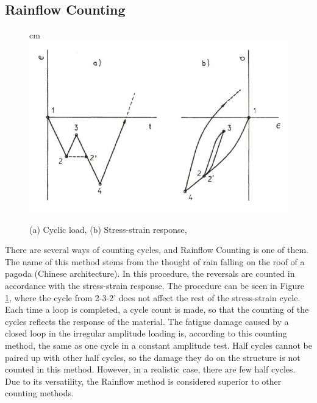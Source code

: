 \subsection{Rainflow Counting}
\label{sec:rainflow}
\begin{figure}
     cm 
    \centering
    \includegraphics[scale=0.6]{figures/count}
\caption[$\; \:$Cyclic load and stress-strain response]{(a) Cyclic load, (b) Stress-strain response,   \cite{fatigue2016} }
 \label{fig:count}
\end{figure}
There are several ways of counting cycles, and Rainflow Counting is one of them. The name of this method stems from the thought of rain falling on the roof of a pagoda (Chinese architecture). In this procedure, the reversals are counted in accordance with the stress-strain response. The procedure can be seen in Figure \ref{fig:count}, where the cycle from 2-3-2' does not affect the rest of the stress-strain cycle. Each time a loop is completed, a cycle count is made, so that the counting of the cycles reflects the response of the material. The fatigue damage caused by a closed loop in the irregular amplitude loading is, according to this counting method, the same as one cycle in a constant amplitude test. Half cycles cannot be paired up with other half cycles, so the damage they do on the structure is not counted in this method. However, in a realistic case, there are few half cycles. Due to its versatility, the Rainflow method is considered superior to other counting methods. \\\\

